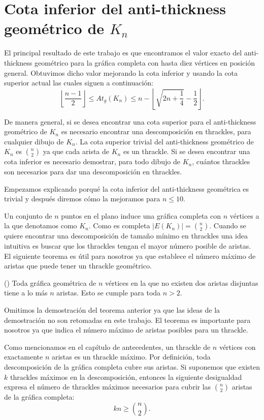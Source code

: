 \section{Cota inferior del anti-thickness geométrico de $K_n$}\label{sec:cota_inf}
El principal resultado de este trabajo es que encontramos el valor exacto del
anti-thickness geométrico para la gráfica completa con hasta diez vértices en
posición general. Obtuvimos dicho valor mejorando la cota inferior y usando la cota superior actual las cuales siguen a continuación:
\begin{equation}
\left\lfloor\frac{n-1}{2}\right\rfloor \leq At_g(K_n) \leq n - \left\lfloor
\sqrt{2n + \frac{1}{4}} - \frac{1}{2} \right\rfloor.
\label{ecuacion_cotas_atg}
\end{equation}

De manera general, si se desea encontrar una cota superior para el
anti-thickness geométrico de $K_n$ es necesario encontrar una descomposición en
thrackles, para cualquier dibujo de $K_n$. La cota superior trivial del
anti-thickness geométrico de $K_n$ es $\binom{n}{2}$ ya que cada arista de
$K_n$ es un thrackle. Si se desea encontrar una cota inferior es necesario
demostrar, para todo dibujo de $K_n$, cuántos thrackles son necesarios para dar
una descomposición en thrackles.

Empezamos explicando porqué la cota inferior del anti-thickness geométrica es
trivial y después diremos cómo la mejoramos para $n\leq 10$.

Un conjunto de $n$ puntos en el plano induce una gráfica completa con $n$
vértices a la que denotamos como $K_n$. Como es completa $|E(K_n)|=
\binom{n}{2}$.
Cuando se quiere encontrar una descomposición de tamaño mínimo en thrackles una idea intuitiva es buscar que los thrackles tengan el mayor número posible de aristas. El siguiente teorema es útil para nosotros ya que establece el número máximo de aristas que puede tener un thrackle geométrico.
\begin{theorem}(\cite{Pach2013b})
  Toda gráfica geométrica de $n$ vértices en la
  que no existen dos aristas disjuntas tiene a lo más $n$ aristas. Esto se
  cumple para toda $n>2$.
\end{theorem}

Omitimos la demostración del teorema anterior ya que las ideas de la
demostración no son retomadas en este trabajo. El teorema es importante para
nosotros ya que indica el número máximo de aristas posibles para un thrackle.

Como mencionamos en el capítulo de antecedentes, un thrackle de $n$ vértices
con exactamente $n$ aristas es un thrackle máximo. Por definición, toda
descomposición de la gráfica completa cubre sus aristas. Si suponemos que
existen $k$ thrackles máximos en la descomposición, entonces la siguiente
desigualdad expresa el número de thrackles máximos necesarios para cubrir las
$\binom{n}{2}$ aristas de la gráfica completa:
\[ kn \geq \binom{n}{2}. \]

